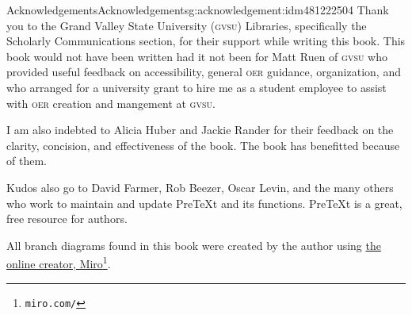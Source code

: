 \documentclass[oneside,10pt,]{book}
\newcommand{\initialism}[1]{\textsc{\MakeLowercase{#1}}}
\begin{document}
\typeout{************************************************}
%
\begin{acknowledgement}{Acknowledgements}{}{Acknowledgements}{}{}{g:acknowledgement:idm481222504}
Thank you to the Grand Valley State University (\initialism{GVSU}) Libraries, specifically the Scholarly Communications section, for their support while writing this book. This book would not have been written had it not been for Matt Ruen of \initialism{GVSU} who provided useful feedback on accessibility, general \initialism{OER} guidance, organization, and who arranged for a university grant to hire me as a student employee to assist with \initialism{OER} creation and mangement at \initialism{GVSU}.%
\par
I am also indebted to Alicia Huber and Jackie Rander for their feedback on the clarity, concision, and effectiveness of the book. The book has benefitted because of them.%
\par
Kudos also go to David Farmer, Rob Beezer, Oscar Levin, and the many others who work to maintain and update PreTeXt and its functions. PreTeXt is a great, free resource for authors.%
\par
All branch diagrams found in this book were created by the author using \href{https://miro.com/}{the online creator, Miro}\footnote{\nolinkurl{miro.com/}\label{g:fn:idm481210344}}.%
\end{acknowledgement}
%
%
\typeout{************************************************}
\typeout{************************************************}
%
\end{document}

